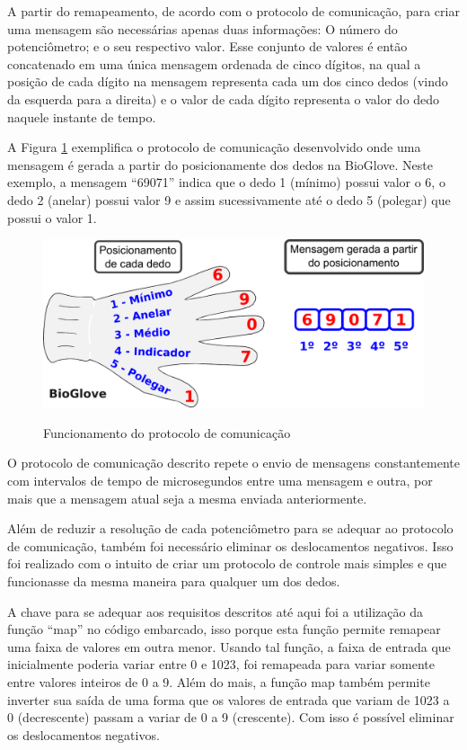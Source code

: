 \documentclass[
	12pt,				%
	openright,			%
	oneside,			%
	a4paper,			%
	english,			%
	brazil				%
	]{abntex2}
\begin{document}
		A partir do remapeamento, de acordo com o protocolo de comunicação, para criar uma mensagem são necessárias apenas duas informações: O número do potenciômetro; e o seu respectivo valor. Esse conjunto de valores é então concatenado em uma única mensagem ordenada de cinco dígitos, na qual a posição de cada dígito na mensagem representa cada um dos cinco dedos (vindo da esquerda para a direita) e o valor de cada dígito representa o valor do dedo naquele instante de tempo.  
		
		A Figura \ref{Fig:glove-create-msg1} exemplifica o protocolo de comunicação desenvolvido onde uma mensagem é gerada a partir do posicionamente dos dedos na BioGlove. Neste exemplo, a mensagem ``69071'' indica que o dedo 1 (mínimo) possui valor o 6, o dedo 2 (anelar) possui valor 9 e assim sucessivamente até o dedo 5 (polegar) que possui o valor 1.


		\begin{figure}[h!]
			\centering
			\caption{Funcionamento do protocolo de comunicação}
  		\includegraphics[width=12cm]{./figures/glove-create-msg1.png}
  		\label{Fig:glove-create-msg1}
		\end{figure}
		

		O protocolo de comunicação descrito repete o envio de mensagens constantemente com intervalos de tempo de microsegundos entre uma mensagem e outra, por mais que a mensagem atual seja a mesma enviada anteriormente.   
		
		Além de reduzir a resolução de cada potenciômetro para se adequar ao protocolo de comunicação, também foi necessário eliminar os deslocamentos negativos. Isso foi realizado com o intuito de criar um protocolo de controle mais simples e que funcionasse da mesma maneira para qualquer um dos dedos.

	 A chave para se adequar aos requisitos descritos até aqui foi a utilização da função ``map'' no código embarcado, isso porque esta função permite remapear uma faixa de valores em outra menor. Usando tal função, a faixa de entrada que inicialmente poderia variar entre 0 e 1023, foi remapeada para variar somente entre valores inteiros de 0 a 9. Além do mais, a função map também permite inverter sua saída de uma forma que os valores de entrada que variam de 1023 a 0 (decrescente) passam a variar de 0 a 9 (crescente). Com isso é possível eliminar os deslocamentos negativos.
\end{document}
